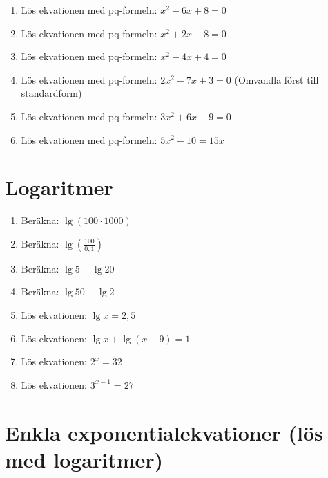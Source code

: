 \documentclass[a4paper,11pt]{article}
\begin{document}
\begin{enumerate}[label=\textbf{\arabic*.}]
    \item Lös ekvationen med pq-formeln: $x^2 - 6x + 8 = 0$
    
    \item Lös ekvationen med pq-formeln: $x^2 + 2x - 8 = 0$
    
    \item Lös ekvationen med pq-formeln: $x^2 - 4x + 4 = 0$
    
    \item Lös ekvationen med pq-formeln: $2x^2 - 7x + 3 = 0$ (Omvandla först till standardform)
    
    \item Lös ekvationen med pq-formeln: $3x^2 + 6x - 9 = 0$ 
    
    \item Lös ekvationen med pq-formeln: $5x^2 - 10 = 15x$ 
\end{enumerate}

\section{Logaritmer}

\begin{enumerate}[label=\textbf{\arabic*.}]
    \item Beräkna: $\lg(100 \cdot 1000)$
    
    \item Beräkna: $\lg\left(\frac{100}{0,1}\right)$
    
    \item Beräkna: $\lg 5 + \lg 20$
    
    \item Beräkna: $\lg 50 - \lg 2$
    
    \item Lös ekvationen: $\lg x = 2,5$
    
    \item Lös ekvationen: $\lg x + \lg (x-9) = 1$
    
    \item Lös ekvationen: $2^x = 32$
    
    \item Lös ekvationen: $3^{x-1} = 27$
\end{enumerate}

\section{Enkla exponentialekvationer (lös med logaritmer)}
\end{document}
